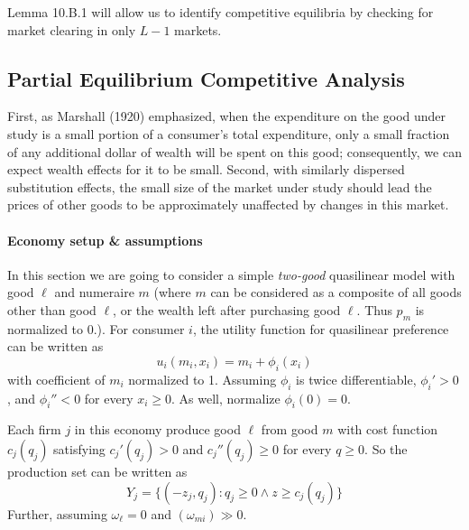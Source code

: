 \documentclass{report}
\begin{document}
	 	\begin{remark}
	 		Lemma 10.B.1 will allow us to identify competitive equilibria by checking for market clearing in only $L - 1$ markets. 
	 	\end{remark}
	 	
	 \subsection{Partial Equilibrium Competitive Analysis}
	 	\begin{remark}
	 		First, as Marshall (1920) emphasized, when the expenditure on the good under study is a small portion of a consumer's total expenditure, only a small fraction of any additional dollar of wealth will be spent on this good; consequently, we can expect wealth effects for it to be small. Second, with similarly dispersed substitution effects, the small size of the market under study should lead the prices of other goods to be approximately unaffected by changes in this market.
	 	\end{remark}
	 	
	 	\paragraph{Economy setup \& assumptions} In this section we are going to consider a simple \emph{two-good} quasilinear model with good $\ell$ and numeraire $m$ (where $m$ can be considered as a composite of all goods other than good $\ell$, or the wealth left after purchasing good $\ell$. Thus $p_m$ is normalized to $0$.). For consumer $i$, the utility function for quasilinear preference can be written as 
		 	\begin{equation}
		 		u_i (m_i, x_i) = m_i + \phi_i(x_i)
		 	\end{equation}
	 		with coefficient of $m_i$ normalized to 1. Assuming $\phi_i$ is twice differentiable, $\phi_i' > 0$, and $\phi_i'' < 0$ for every $x_i \geq 0$. As well, normalize $\phi_i(0) = 0$.
	 		\par Each firm $j$ in this economy produce good $\ell$ from good $m$ with cost function $c_j(q_j)$ satisfying $c_j'(q_j) >0$ and $c_j''(q_j) \geq 0$ for every $q \geq 0$. So the production set can be written as 
	 		\begin{equation}
	 			Y_j = \{(-z_j, q_j): q_j \geq 0 \land z \geq c_j(q_j)\}
	 		\end{equation}
	 		Further, assuming $\omega_\ell = 0$ and $(\omega_{mi}) \gg 0$.
	 		
\end{document}
